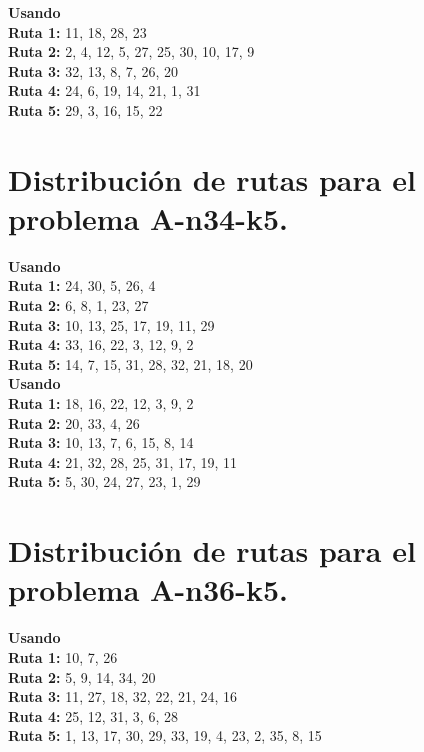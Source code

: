 \documentclass[a4paper,10pt,twocolumn]{article}
\begin{document}
	\textbf{Usando } 							\\
	\textbf{Ruta 1:} 11, 18, 28, 23 					\\
	\textbf{Ruta 2:} 2, 4, 12, 5, 27, 25, 30, 10, 17, 9 \\
	\textbf{Ruta 3:} 32, 13, 8, 7, 26, 20 				\\
	\textbf{Ruta 4:} 24, 6, 19, 14, 21, 1, 31 			\\
	\textbf{Ruta 5:} 29, 3, 16, 15, 22 					
	
	\section*{Distribución de rutas para el problema A-n34-k5.}
	\label{tab:result34_5}
	
	\hspace{9pt} \textbf{Usando } 	   \\
	\textbf{Ruta 1:} 24, 30, 5, 26, 4 				   \\
	\textbf{Ruta 2:} 6, 8, 1, 23, 27 				   \\
	\textbf{Ruta 3:} 10, 13, 25, 17, 19, 11, 29 	   \\
	\textbf{Ruta 4:} 33, 16, 22, 3, 12, 9, 2    	   \\
	\textbf{Ruta 5:} 14, 7, 15, 31, 28, 32, 21, 18, 20 \\

	\textbf{Usando }						\\
	\textbf{Ruta 1:} 18, 16, 22, 12, 3, 9, 2 		\\
	\textbf{Ruta 2:} 20, 33, 4, 26 					\\
	\textbf{Ruta 3:} 10, 13, 7, 6, 15, 8, 14		\\
	\textbf{Ruta 4:} 21, 32, 28, 25, 31, 17, 19, 11 \\
	\textbf{Ruta 5:} 5, 30, 24, 27, 23, 1, 29		
	
	\section*{Distribución de rutas para el problema A-n36-k5.}
	\label{tab:result36_5}
	
	\hspace{9pt} \textbf{Usando }					\\
	\textbf{Ruta 1:} 10, 7, 26	     								\\
	\textbf{Ruta 2:} 5, 9, 14, 34, 20   			 	 			\\
	\textbf{Ruta 3:} 11, 27, 18, 32, 22, 21, 24, 16	 				\\
	\textbf{Ruta 4:} 25, 12, 31, 3, 6, 28	     	 	 			\\
	\textbf{Ruta 5:} 1, 13, 17, 30, 29, 33, 19, 4, 23, 2, 35, 8, 15 \\
	
\end{document}

